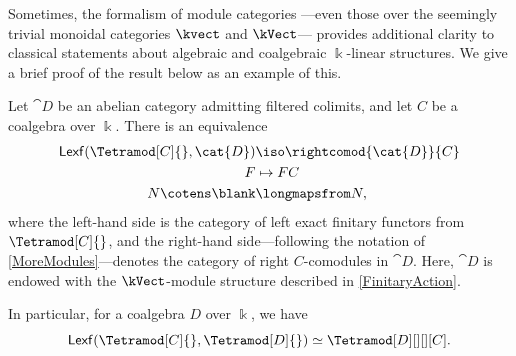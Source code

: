 Sometimes, the formalism of module categories%
—even those over the seemingly trivial monoidal categories \(\kvect\) and \(\kVect\)—%
provides additional clarity to classical statements about algebraic and coalgebraic \(\Bbbk\)\hyp{}linear structures.
We give a brief proof of the result below as an example of this.

\begin{proposition}\label{TakeuchiEilenbergWatts}
  Let \(\cat{D}\) be an abelian category admitting filtered colimits, and let \(C\) be a coalgebra over \(\Bbbk\).
  There is an equivalence
  \[
    \begin{aligned}
      \mathsf{Lexf}(\Tetramod[C]{}, \cat{D}) &\iso \rightcomod{\cat{D}}{C} \\
      F &\mapsto FC \\
      N \cotens \blank &\longmapsfrom N,
    \end{aligned}
  \]
  where the left-hand side is the category of left exact finitary functors from \(\Tetramod[C]{}\),
  and the right-hand side—following the notation of \cref{MoreModules}—denotes the category of right \(C\)\hyp{}comodules in \(\cat{D}\).
  Here, \(\cat{D}\) is endowed with the \(\kVect\)\hyp{}module structure described in \cref{FinitaryAction}.

  In particular, for a coalgebra \(D\) over \(\Bbbk\), we have
  \[
    \mathsf{Lexf}(\Tetramod[C]{}, \Tetramod[D]{}) \simeq \Tetramod[D][][][C].
  \]
\end{proposition}
